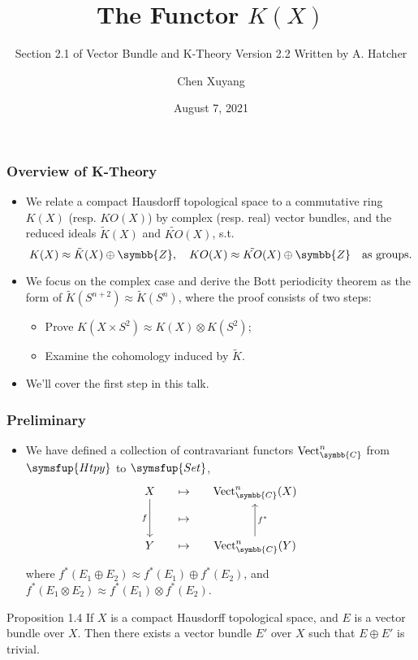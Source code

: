 \documentclass[noamsthm]{beamer}
\title{The Functor \texorpdfstring{$K(X)$}{K(X)}}
\subtitle{Section 2.1 of Vector Bundle and K-Theory Version 2.2 Written by A. Hatcher}
\author{Chen Xuyang}
\date{August 7, 2021}
\DeclareMathOperator\Vect{Vect}
\newcommand\iso{\approx}
\newcommand\BZ{\symbb{Z}}
\newcommand\BC{\symbb{C}}
\newcommand\rk{\tilde{K}}
\newcommand\cat[1]{\symsfup{#1}}
\begin{document}
  \begin{frame}
    \titlepage
  \end{frame}
  \begin{frame}
    \frametitle{Overview of K-Theory}
    \begin{itemize}
      \item We relate a compact Hausdorff topological space to a commutative ring $K(X)$ (resp. $KO(X)$) by complex (resp. real) vector bundles, and the reduced ideals $\tilde K(X)$ and $\tilde{KO}(X)$, s.t.
      \begin{equation*}
        K(X)\iso \tilde K(X)\oplus \BZ,\quad KO(X)\iso \tilde{KO}(X)\oplus \BZ\quad\text{as groups.}
      \end{equation*}
      \item We focus on the complex case and derive the Bott periodicity theorem as the form of $\rk(S^{n+2})\iso\rk(S^n)$, where the proof consists of two steps:
        \begin{itemize}
          \item Prove $K(X\times S^2)\iso K(X)\otimes K(S^2)$;
          \item Examine the cohomology induced by $\tilde{K}$.
        \end{itemize}
      \item We'll cover the first step in this talk.
    \end{itemize}
  \end{frame}

  \begin{frame}
    \frametitle{Preliminary}
    \begin{itemize}
      \item We have defined a collection of contravariant functors $\Vect^n_{\BC}$ from $\cat{Htpy}$ to $\cat{Set}$,
      \begin{equation*}
        \begin{tikzcd}[sep=small, ampersand replacement=\&]
          X \& \mapsto \& \Vect^n_{\BC}(X)\\
          \& \mapsto\\
          Y \& \mapsto \& \Vect^n_{\BC}(Y)
          \arrow[from=1-1,]{3-1}[swap]{f}
          \arrow[from=1-3,leftarrow,]{3-3}{f^*}
        \end{tikzcd}%
      \end{equation*}
      where $f^*(E_1\oplus E_2)\iso f^*(E_1)\oplus f^*(E_2)$, and $f^*(E_1\otimes E_2)\iso f^*(E_1)\otimes f^*(E_2)$.
    \end{itemize}
    \begin{block}{Proposition 1.4}
      If $X$ is a compact Hausdorff topological space, and $E$ is a vector bundle over $X$. Then there exists a vector bundle $E'$ over $X$ such that $E\oplus E'$ is trivial.
    \end{block}
  \end{frame}
\end{document}
